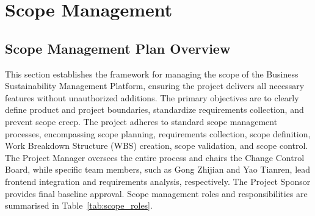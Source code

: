 \documentclass[12pt,a4paper]{article}
\begin{document}
\clearpage
\section{Scope Management}
\subsection{Scope Management Plan Overview}
This section establishes the framework for managing the scope of the Business Sustainability Management Platform, ensuring the project delivers all necessary features without unauthorized additions. The primary objectives are to clearly define product and project boundaries, standardize requirements collection, and prevent scope creep. The project adheres to standard scope management processes, encompassing scope planning, requirements collection, scope definition, Work Breakdown Structure (WBS) creation, scope validation, and scope control. The Project Manager oversees the entire process and chairs the Change Control Board, while specific team members, such as Gong Zhijian and Yao Tianren, lead frontend integration and requirements analysis, respectively. The Project Sponsor provides final baseline approval. Scope management roles and responsibilities are summarised in Table~\ref{tab:scope_roles}.
\end{document}
